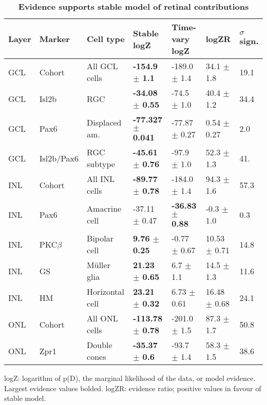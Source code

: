 \begin{table}[!ht]
    \caption{{\bf Evidence supports stable model of retinal contributions}}
    \begin{tabular}{|l|l|l|l|l|l|l|} 
        \hline
        {\bf Layer} & {\bf Marker} & {\bf Cell type} & {\bf Stable logZ} & {\bf Time-vary logZ} & {\bf logZR} & {\bf $\sigma$ sign.}\\ \hline \hline
        GCL & Cohort & All GCL cells & {\bf -154.9 $\pm$ 1.1} & -189.0 $\pm$ 1.4 & 34.1 $\pm$ 1.8 & 19.1\\ \hline \hline
        GCL & Isl2b & RGC & {\bf -34.08 $\pm$ 0.55} & -74.5 $\pm$ 1.0 & 40.4 $\pm$ 1.2 & 34.4\\ \hline
        GCL & Pax6 & Displaced am. & {\bf -77.327 $\pm$ 0.041} & -77.87 $\pm$ 0.27 & 0.54 $\pm$ 0.27 & 2.0\\ \hline
        GCL & Isl2b/Pax6 & RGC subtype & {\bf -45.61 $\pm$ 0.76} & -97.9 $\pm$ 1.0 & 52.3 $\pm$ 1.3 & 41.\\ \hline \hline
        INL & Cohort & All INL cells & {\bf -89.77 $\pm$ 0.78} & -184.0 $\pm$ 1.4 & 94.3 $\pm$ 1.6 & 57.3\\ \hline \hline
        INL & Pax6 & Amacrine cell & -37.11 $\pm$ 0.47 & {\bf -36.83 $\pm$ 0.88} & -0.3 $\pm$ 1.0 & 0.3\\ \hline
        INL & PKC$\beta$ & Bipolar cell & {\bf 9.76 $\pm$ 0.25} & -0.77 $\pm$ 0.67 & 10.53 $\pm$ 0.71 & 14.8\\ \hline
        INL & GS & M\"{u}ller glia & {\bf 21.23 $\pm$ 0.65} & 6.7 $\pm$ 1.1 & 14.5 $\pm$ 1.3 & 11.6\\ \hline
        INL & HM & Horizontal cell & {\bf 23.21 $\pm$ 0.32} & 6.73 $\pm$ 0.61 & 16.48 $\pm$ 0.68 & 24.1\\ \hline \hline
        ONL & Cohort & All ONL cells & {\bf -113.78 $\pm$ 0.78} & -201.0 $\pm$ 1.5 & 87.3 $\pm$ 1.7 & 50.8\\ \hline \hline
        ONL & Zpr1 & Double cones & {\bf -35.37 $\pm$ 0.6} & -93.7 $\pm$ 1.4 & 58.3 $\pm$ 1.5 & 38.6\\ \hline
    \end{tabular}
   
    \begin{flushleft}logZ: logarithm of p(D), the marginal likelihood of the data, or model evidence.  Largest evidence values bolded. logZR: evidence ratio; positive values in favour of stable model.
    \end{flushleft}
    \label{lineage_ev}
\end{table}

